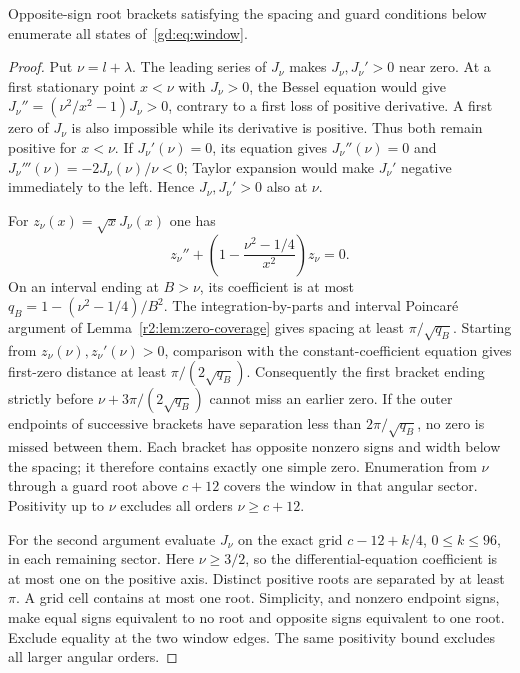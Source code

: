\begin{lemma}\label{gd:lem:coverage}
Opposite-sign root brackets satisfying the spacing and guard conditions
below enumerate all states of~\eqref{gd:eq:window}.
\end{lemma}
\begin{proof}
Put $\nu=l+\lambda$. The leading series of $J_\nu$ makes
$J_\nu,J_\nu'>0$ near zero. At a first stationary point $x<\nu$
with $J_\nu>0$, the Bessel equation would give
$J_\nu''=(\nu^2/x^2-1)J_\nu>0$, contrary to a first loss of
positive derivative. A first zero of $J_\nu$ is also impossible
while its derivative is positive. Thus both remain positive for $x<\nu$.
If $J_\nu'(\nu)=0$, its equation gives $J_\nu''(\nu)=0$ and
$J_\nu'''(\nu)=-2J_\nu(\nu)/\nu<0$; Taylor expansion would make
$J_\nu'$ negative immediately to the left. Hence
$J_\nu,J_\nu'>0$ also at $\nu$.

For $z_\nu(x)=\sqrt{x}J_\nu(x)$ one has
\[
 z_\nu''+\left(1-\frac{\nu^2-1/4}{x^2}\right)z_\nu=0.
\]
On an interval ending at $B>\nu$, its coefficient is at most
$q_B=1-(\nu^2-1/4)/B^2$. The integration-by-parts and interval
Poincar\'e argument of Lemma~\ref{r2:lem:zero-coverage} gives spacing
at least $\pi/\sqrt{q_B}$. Starting from
$z_\nu(\nu),z_\nu'(\nu)>0$, comparison with the constant-coefficient
equation gives first-zero distance at least $\pi/(2\sqrt{q_B})$.
Consequently the first bracket ending strictly before
$\nu+3\pi/(2\sqrt{q_B})$ cannot miss an earlier zero.
If the outer endpoints of successive brackets have separation less
than $2\pi/\sqrt{q_B}$, no zero is missed between them.
Each bracket has opposite nonzero signs and width below the spacing;
it therefore contains exactly one simple zero.
Enumeration from $\nu$ through a guard root above $c+12$ covers the
window in that angular sector. Positivity up to $\nu$ excludes
all orders $\nu\ge c+12$.

For the second argument evaluate $J_\nu$ on the exact grid
$c-12+k/4$, $0\le k\le96$, in each remaining sector.
Here $\nu\ge3/2$, so the differential-equation coefficient is at
most one on the positive axis. Distinct positive roots are separated
by at least $\pi$. A grid cell contains at most one root.
Simplicity, and nonzero endpoint signs, make equal signs equivalent
to no root and opposite signs equivalent to one root.
Exclude equality at the two window edges. The same positivity bound excludes all larger angular orders.
\end{proof}

